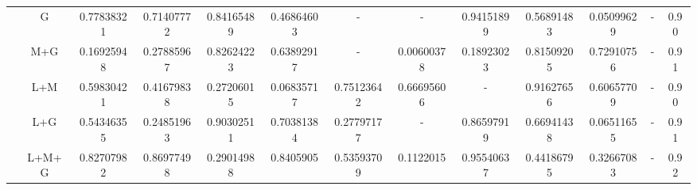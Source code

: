 {\begin{tabular}{ccccccccccccc}
& G & 0.77838321& 0.71407772 &0.84165489 &0.46864603 & - &-&0.94151899& 0.56891483 &0.05099629&-&0.90 \\
& M+G & 0.16925948& 0.27885967 &0.82624223 &0.63892917 & -&0.00600378 &0.18923023& 0.81509205 &0.72910756&-&0.91 \\
& L+M & 0.59830421&0.41679838& 0.27206015 &0.06835717 &0.75123642& 0.66695606&-& 0.91627656 &0.60657709&-&0.90 \\
& L+G & 0.54346355 &0.24851963& 0.90302511 &0.70381384 &0.27797177  &- &0.86597919& 0.66941438& 0.06511655&-&0.91 \\
& L+M+G & 0.82707982& 0.86977498 &0.29014988 &0.8405905 &0.53593709& 0.1122015  &0.95540637& 0.44186795& 0.32667083&-&0.92 \\

\bottomrule
\end{tabular}
}
